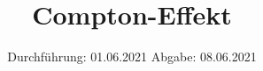 

\subject{V603}
\title{Compton-Effekt}
\date{%
  Durchführung: 01.06.2021
  \hspace{3em}
  Abgabe: 08.06.2021
}



\maketitle
\thispagestyle{empty}
\tableofcontents
\newpage





\nocite{*}
\printbibliography{}




